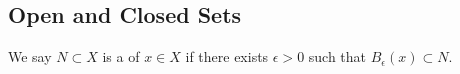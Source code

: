 \begin{comment}
\begin{definition}[Diameter]
Let non-empty $E\subset X$. Then the \vocab{diameter} of $E$ is
\[\diam E\colonequals\sup_{p,q\in E}d(p,q).\]
\end{definition}

\begin{example}
Find the diameter of the open unit ball in $\RR^n$:
\[B=\{\vb{x}\in\RR^n\mid\norm{\vb{x}}<1\}. \]
\begin{proof}
Note that for all $\vb{x},\vb{y}\in\RR^n$,
\[d(\vb{x},\vb{y})=\norm{\vb{x}-\vb{y}}\le\norm{\vb{x}}+\norm{-\vb{y}}=\norm{\vb{x}}+\norm{\vb{y}}<1+1=2. \]
On the other hand, for any $\epsilon>0$, we pick
\[\vb{x}=\brac{1-\frac{\epsilon}{4},0,\dots,0},\quad\vb{y}=\brac{-\brac{1-\frac{\epsilon}{4}},0,\dots,0}. \]
Then $d(\vb{x},\vb{y})=2-\dfrac{\epsilon}{2}>2-\epsilon$. Since $\epsilon$ is arbitrary, we have that $\diam B=2$.
\end{proof}
\end{example}

\begin{proposition}
$E\subset\RR^n$ is bounded if and only if $\diam E<+\infty$.
\end{proposition}

\begin{proof} \

\forward If $E$ is bounded, then there exists $M>0$ such that $\norm{x}\le M$ for all $x \in E$.

Thus for any $x,y \in E$,
\[ d(x,y)=\norm{x-y}\le\norm{x}+\norm{y}\le2M. \]
Thus $\diam E = \sup d(x,y) \le 2M<+\infty$.

\backward Suppose that $\diam E=r$. Pick a random point $x\in E$, suppose that $\norm{x}=R$.

Then for any other $y \in E$,
\[ \norm{y}=\norm{x+(y-x)}\le\norm{x}+\norm{y-x}\le R+r. \]
Thus, by picking $M=R+r$, we obtain $\norm{y}\le M$ for all $y \in E$, and we are done.
\end{proof}

\begin{remark}
Basically we used $x$ to confine $E$ within a ball, which is then confined within an even bigger ball centered at the origin.
\end{remark}
\end{comment}
\pagebreak

\subsection{Open and Closed Sets}
We say $N\subset X$ is a  of $x\in X$ if there exists $\epsilon>0$ such that $B_\epsilon(x)\subset N$.


